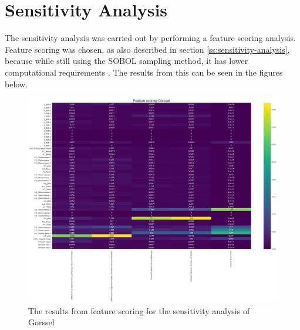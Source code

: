 \section{Sensitivity Analysis}
\label{a:sensitivity-analysis}

The sensitivity analysis was carried out by performing a feature scoring analysis. Feature scoring was chosen, as also described in section \ref{ss:sensitivity-analysis}, because while still using the SOBOL sampling method, it has lower computational requirements \cite{jaxa-rozen_tree-based_2018}. The results from this can be seen in the figures below. 

\begin{figure}[h!]
    \centering
    \includegraphics[width=\textwidth]{report/figures/results/Feature_scoring_Gorssel_100scen.png}
    \caption{The results from feature scoring for the sensitivity analysis of Gorssel}
    \label{fig:feat-scor-g}
\end{figure}

